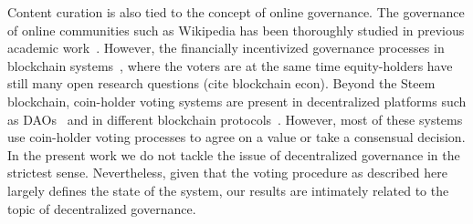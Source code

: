   Content curation is also tied to the concept of online governance. The governance of online communities such as Wikipedia has been thoroughly studied in previous academic work~\cite{leskovec2010governance,forte2008scaling}. However, the financially incentivized governance processes in blockchain systems~\cite{vitalik,ehrsam}, where the voters are at the same time equity-holders have still many open research questions (cite blockchain econ).
   Beyond the Steem blockchain, coin-holder voting systems are present in decentralized platforms such as DAOs~\cite{darkdaos} and in different blockchain protocols~\cite{tezos}. However, most of these systems use coin-holder voting processes to agree on a value or take a consensual decision.
    In the present work we do not tackle the issue of decentralized governance in the strictest sense. Nevertheless, given that the voting procedure as described here largely defines the state of the system, our results are intimately related to the topic of decentralized governance.
    
  
  
